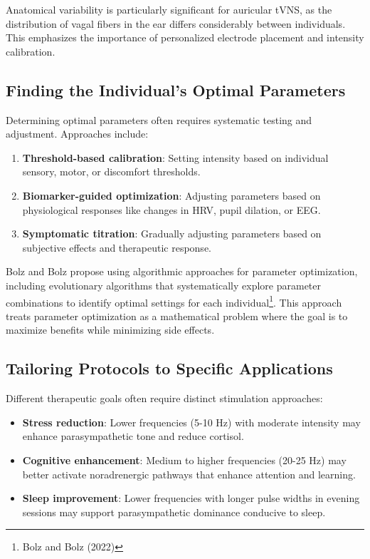 \documentclass[
  Letterpaper,
]{scrbook}
\providecommand{\tightlist}{%
  \setlength{\itemsep}{0pt}\setlength{\parskip}{0pt}}\usepackage{longtable,booktabs,array}
\begin{document}
Anatomical variability is particularly significant for auricular tVNS,
as the distribution of vagal fibers in the ear differs considerably
between individuals. This emphasizes the importance of personalized
electrode placement and intensity calibration.

\subsection{Finding the Individual's Optimal
Parameters}\label{finding-the-individuals-optimal-parameters}

Determining optimal parameters often requires systematic testing and
adjustment. Approaches include:

\begin{enumerate}
\def\labelenumi{\arabic{enumi}.}
\tightlist
\item
  \textbf{Threshold-based calibration}: Setting intensity based on
  individual sensory, motor, or discomfort thresholds.
\item
  \textbf{Biomarker-guided optimization}: Adjusting parameters based on
  physiological responses like changes in HRV, pupil dilation, or EEG.
\item
  \textbf{Symptomatic titration}: Gradually adjusting parameters based
  on subjective effects and therapeutic response.
\end{enumerate}

Bolz and Bolz propose using algorithmic approaches for parameter
optimization, including evolutionary algorithms that systematically
explore parameter combinations to identify optimal settings for each
individual\footnote{Bolz and Bolz (2022)}. This approach treats
parameter optimization as a mathematical problem where the goal is to
maximize benefits while minimizing side effects.

\subsection{Tailoring Protocols to Specific
Applications}\label{tailoring-protocols-to-specific-applications}

Different therapeutic goals often require distinct stimulation
approaches:

\begin{itemize}
\tightlist
\item
  \textbf{Stress reduction}: Lower frequencies (5-10 Hz) with moderate
  intensity may enhance parasympathetic tone and reduce cortisol.
\item
  \textbf{Cognitive enhancement}: Medium to higher frequencies (20-25
  Hz) may better activate noradrenergic pathways that enhance attention
  and learning.
\item
  \textbf{Sleep improvement}: Lower frequencies with longer pulse widths
  in evening sessions may support parasympathetic dominance conducive to
  sleep.
\end{itemize}
\end{document}
